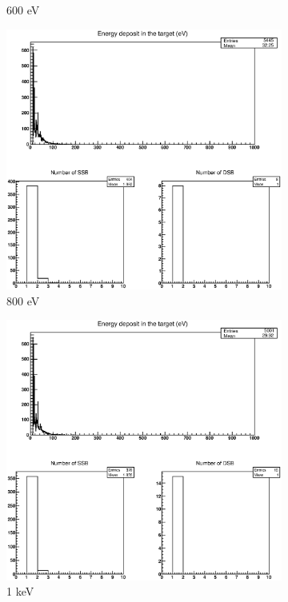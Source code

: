 \begin{figure}
\begin{subfigure}{.5\textwidth}
  \caption{600 eV}
  \label{fig:sube5}
\end{subfigure}%
\begin{subfigure}{.5\textwidth}
  \centering
  \includegraphics[width=.78\linewidth]{./Figures/5.eps}
  \caption{800 eV}
  \label{fig:sube6}
\end{subfigure}
\begin{subfigure}{.5\textwidth}
  \centering
  \includegraphics[width=.78\linewidth]{./Figures/6.eps}
  \caption{1 keV}
  \label{fig:sube7}
\end{subfigure}%
\begin{subfigure}{.5\textwidth}
  \centering

\end{subfigure}
\end{figure}
